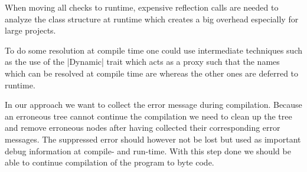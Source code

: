When moving all checks to runtime, expensive reflection calls are needed to analyze the class structure at runtime which creates a big overhead especially for large projects.

To do some resolution at compile time one could use intermediate techniques such as the use of the |Dynamic| trait which acts as a proxy such that the names which can be resolved at compile time are whereas the other ones are deferred to runtime.

In our approach we want to collect the error message during compilation. Because an erroneous tree cannot continue the compilation we need to clean up the tree and remove erroneous nodes after having collected their corresponding error messages. The suppressed error should however not be lost but used as important debug information at compile- and run-time. With this step done we should be able to continue compilation of the program to byte code.
